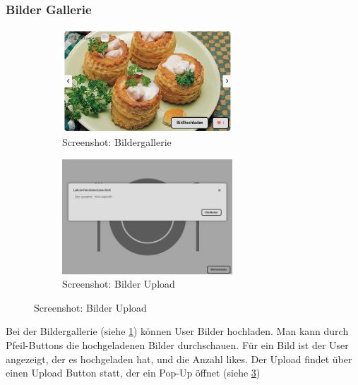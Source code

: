 \subsubsection*{Bilder Gallerie}

\begin{figure}[htp]
    \begin{subfigure}[b]{0.5\textwidth}
        \centering
        \includegraphics[width=0.7\textwidth]{images/Resultate_Bildergallerie.png}
        \caption{Screenshot: Bildergallerie}
        \label{fig:r-bildergallerie}
    \end{subfigure}
    \begin{subfigure}[b]{0.5\textwidth}
        \centering
        \includegraphics[width=0.7\textwidth]{images/Resultat_Bildergallerie_upload.png}
        \caption{Screenshot: Bilder Upload}
        \label{fig:r-bildpopup}
    \end{subfigure}
    \hfill
\end{figure}

Bei der Bildergallerie (siehe \ref{fig:r-bildergallerie}) können User Bilder
hochladen. Man kann durch Pfeil-Buttons die hochgeladenen Bilder durchschauen.
Für ein Bild ist der User angezeigt, der es hochgeladen hat, und die Anzahl
likes. Der Upload findet über einen Upload Button statt, der ein Pop-Up öffnet
(siehe \ref{fig:r-bildpopup})


